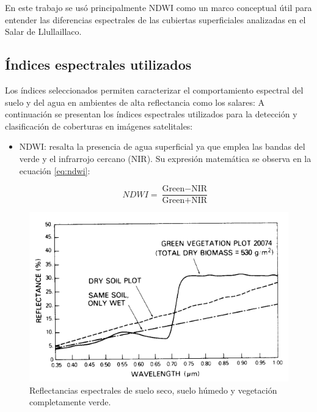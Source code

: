 En este trabajo se usó principalmente NDWI como un marco conceptual útil para entender las diferencias espectrales de las cubiertas superficiales analizadas en el Salar de Llullaillaco.


\subsection*{Índices espectrales utilizados}

Los índices seleccionados permiten caracterizar el comportamiento espectral del suelo y del agua en ambientes de alta reflectancia como los salares:
A continuación se presentan los índices espectrales utilizados para la detección y clasificación de coberturas en imágenes satelitales:

\begin{itemize}
    \item NDWI: resalta la presencia de agua superficial ya que emplea las bandas del verde y el infrarrojo cercano (NIR). Su expresión matemática se observa en la ecuación \ref{eq:ndwi}:

    \begin{equation}
        \label{eq:ndwi}
        NDWI = \frac{\text{Green} - \text{NIR}}{\text{Green} + \text{NIR}}
    \end{equation}

\end{itemize}


\begin{figure}[htpb]
	\centering
	\includegraphics[scale=.5]{Figures/fig3.png}
	\caption{Reflectancias espectrales de suelo seco, suelo húmedo y vegetación completamente verde\protect\footnotemark.}
	\label{fig:palabraIngles}
\end{figure}

